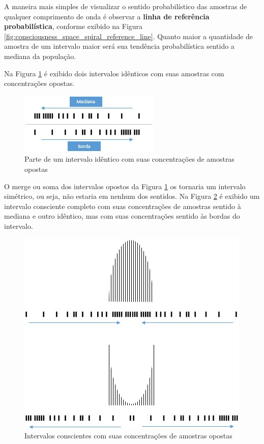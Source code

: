 A maneira mais simples de visualizar o sentido probabilístico das amostras de qualquer comprimento de onda é observar a \textbf{linha de referência probabilística}, conforme exibido na Figura \ref{fig:consciousness_space_spiral_reference_line}. Quanto maior a quantidade de amostra de um intervalo maior será sua tendência probabilística sentido a mediana da população.

Na Figura \ref{fig:consciousness_concentration_of_opposite_samples} é exibido dois intervalos idênticos com suas amostras com concentrações opostas.
	\begin{figure}[H]
	\caption{Parte de um intervalo idêntico com suas concentrações de amostras opostas}
	\label{fig:consciousness_concentration_of_opposite_samples}
	\centering
	\includegraphics[scale=1.2]{sections/images/consciousness_concentration_of_opposite_samples.jpg}
	\end{figure}

O merge ou soma dos intervalos opostos da Figura \ref{fig:consciousness_concentration_of_opposite_samples} os tornaria um intervalo simétrico, ou seja, não estaria em nenhum dos sentidos.
Na Figura \ref{fig:consciousness_concentration_of_opposite_samples_within_range} é exibido um intervalo consciente completo com suas concentrações de amostras sentido à mediana e outro idêntico, mas com suas concentrações sentido às bordas do intervalo.
	\begin{figure}[H]
	\caption{Intervalos conscientes com suas concentrações de amostras opostas}
	\label{fig:consciousness_concentration_of_opposite_samples_within_range}
	\centering
	\includegraphics[scale=.7]{sections/images/consciousness_concentration_of_opposite_samples_within_range.jpg}
	\end{figure}

